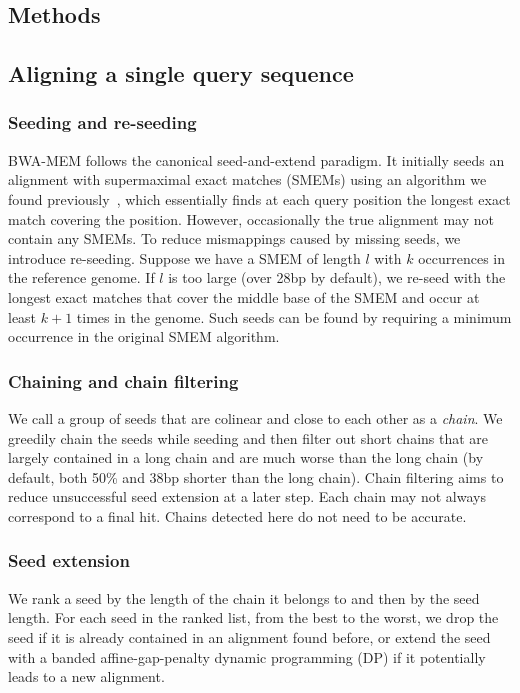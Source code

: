 \documentclass{bioinfo}
\begin{document}
\begin{methods}

\section{Methods}

\subsection{Aligning a single query sequence}

\subsubsection{Seeding and re-seeding} BWA-MEM follows the canonical
seed-and-extend paradigm. It initially seeds an alignment with supermaximal
exact matches (SMEMs) using an algorithm we found previously~\citep[Algorithm
5]{Li:2012fk}, which essentially finds at each query position the longest exact
match covering the position. However, occasionally the true alignment may not
contain any SMEMs.  To reduce mismappings caused by missing seeds, we introduce
re-seeding. Suppose we have a SMEM of length $l$ with $k$ occurrences in the
reference genome. If $l$ is too large (over 28bp by default), we re-seed
with the longest exact matches that cover the middle base of the SMEM and occur
at least $k+1$ times in the genome. Such seeds can be found by requiring a
minimum occurrence in the original SMEM algorithm.

\subsubsection{Chaining and chain filtering} We call a group of seeds that are
colinear and close to each other as a \emph{chain}. We greedily chain the seeds
while seeding and then filter out short chains that are largely contained in a
long chain and are much worse than the long chain (by default, both 50\% and
38bp shorter than the long chain). Chain filtering aims to reduce unsuccessful
seed extension at a later step. Each chain may not always correspond to a final
hit. Chains detected here do not need to be accurate.

\subsubsection{Seed extension} We rank a seed by the length of the chain it
belongs to and then by the seed length. For each seed in the ranked list, from
the best to the worst, we drop the seed if it is already contained in an
alignment found before, or extend the seed with a banded affine-gap-penalty
dynamic programming (DP) if it potentially leads to a new alignment.


\end{methods}
\end{document}
